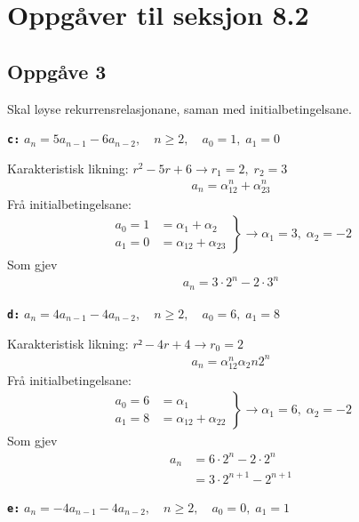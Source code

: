 \documentclass[a4paper, 11pt]{article}
\newcommand{\deloppg}[1]{\vspace{1mm}\noindent \textbf{\tt \themecolor{#1:}}}
\newcommand{\themeshade}{Mahogany}
\newcommand{\themecolor}[1]{\textcolor{\themeshade}{#1}}
\begin{document}
\section*{Oppgåver til seksjon 8.2} %
\subsection*{Oppgåve 3}
Skal løyse rekurrensrelasjonane, saman med initialbetingelsane.

\deloppg{c} \(a_n = 5a_{n-1} - 6a_{n-2}, \quad n \geq 2, \quad a_0 = 1, \; a_1 = 0\)

\noindent Karakteristisk likning: \(r^2 - 5r + 6 \rightarrow r_1=2, \; r_2 = 3\)
\begin{align*}
    a_n = \alpha_12^n + \alpha_23^n
\end{align*}
Frå initialbetingelsane:
\begin{align*}
    \left.\begin{array}{rl}
    a_0 = 1 &= \alpha_1 + \alpha_2 \\
    a_1 = 0 &= \alpha_12 + \alpha_23
    \end{array} \right\} \rightarrow \alpha_1 = 3, \; \alpha_2 = -2
\end{align*}
Som gjev
\begin{align*}
    a_n = 3 \cdot 2^n -2 \cdot 3^n
\end{align*}


\vspace{8mm}
\deloppg{d} \(a_n = 4a_{n-1} - 4a_{n-2}, \quad n \geq 2, \quad a_0 = 6, \; a_1 = 8\)

\noindent Karakteristisk likning: \( r² - 4r + 4 \rightarrow r_0 = 2\)
\begin{align*}
    a_n = \alpha_12^n \alpha_2n2^n
\end{align*}
Frå initialbetingelsane:
\begin{align*}
    \left.\begin{array}{rl}
        a_0 = 6 &= \alpha_1 \\
        a_1 = 8 &= \alpha_12 + \alpha_22
    \end{array} \right\} \rightarrow \alpha_1 = 6, \; \alpha_2 = -2
\end{align*}
Som gjev
\begin{align*}
    a_n &= 6\cdot 2^n - 2 \cdot 2^n \\
    &= 3 \cdot 2^{n+1} - 2^{n + 1}
\end{align*}


\newpage
\deloppg{e} \(a_n = -4a_{n-1} -4a_{n-2}, \quad n \geq 2, \quad a_0 = 0,\; a_1 = 1\)
\end{document}
